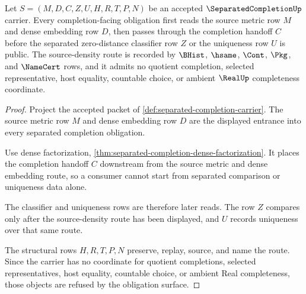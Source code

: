 \begin{theorem}
\label{thm:separatedcompletion-source-density-obligation}
Let $S=(M,D,C,Z,U,H,R,T,P,N)$ be an accepted $\SeparatedCompletionUp$ carrier. Every completion-facing obligation first reads the source metric row $M$ and dense embedding row $D$, then passes through the completion handoff $C$ before the separated zero-distance classifier row $Z$ or the uniqueness row $U$ is public. The source-density route is recorded by $\BHist$, $\hsame$, $\Cont$, $\Pkg$, and $\NameCert$ rows, and it admits no quotient completion, selected representative, host equality, countable choice, or ambient $\RealUp$ completeness coordinate.
\end{theorem}
\begin{proof}
Project the accepted packet of \autoref{def:separated-completion-carrier}. The source metric row $M$ and dense embedding row $D$ are the displayed entrance into every separated completion obligation.

Use dense factorization, \autoref{thm:separated-completion-dense-factorization}. It places the completion handoff $C$ downstream from the source metric and dense embedding route, so a consumer cannot start from separated comparison or uniqueness data alone.

The classifier and uniqueness rows are therefore later reads. The row $Z$ compares only after the source-density route has been displayed, and $U$ records uniqueness over that same route.

The structural rows $H,R,T,P,N$ preserve, replay, source, and name the route. Since the carrier has no coordinate for quotient completions, selected representatives, host equality, countable choice, or ambient Real completeness, those objects are refused by the obligation surface.
\end{proof}

